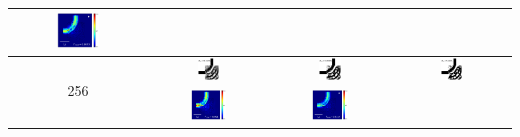 \begin{table}[ht]
\begin{tabular}{|c|c|c|c|}
      \includegraphics[width=0.33\textwidth]{image/results/bend/CMA-ES/visualize_field_fab_128.png} \\
    \hline
      \multirow{2}{*}{256} &
      \includegraphics[width=0.20\textwidth]{image/results/bend/CMA-ES/visualize_eps_cont_256.png} &
      \includegraphics[width=0.20\textwidth]{image/results/bend/CMA-ES/visualize_eps_disc_256.png} &
      \includegraphics[width=0.20\textwidth]{image/results/bend/CMA-ES/visualize_eps_fab_256.png} \\
      \cline{2-4}
      &
      \includegraphics[width=0.33\textwidth]{image/results/bend/CMA-ES/visualize_field_cont_256.png} &
      \includegraphics[width=0.33\textwidth]{image/results/bend/CMA-ES/visualize_field_disc_256.png} &

\end{tabular}
\end{table}
